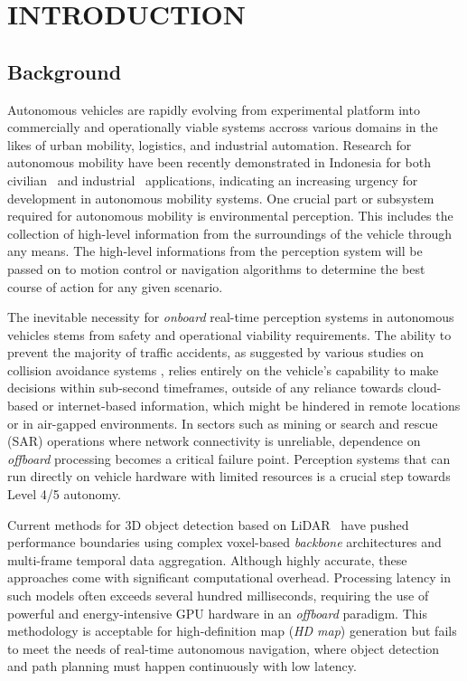 \chapter{INTRODUCTION}

\section{Background}

\sloppy

Autonomous vehicles are rapidly evolving from experimental platform into commercially and operationally viable systems accross various domains in the likes of urban mobility, logistics, and industrial automation. Research for autonomous mobility have been recently demonstrated in Indonesia for both civilian~\parencite{icar_drl} and industrial~\parencite{brin2024autonomous} applications, indicating an increasing urgency for development in autonomous mobility systems. One crucial part or subsystem required for autonomous mobility is environmental perception. This includes the collection of high-level information from the surroundings of the vehicle through any means. The high-level informations from the perception system will be passed on to motion control or navigation algorithms to determine the best course of action for any given scenario.

The inevitable necessity for \emph{onboard} real-time perception systems in autonomous vehicles stems from safety and operational viability requirements. The ability to prevent the majority of traffic accidents, as suggested by various studies on collision avoidance systems \parencite{external_dp_av}, relies entirely on the vehicle's capability to make decisions within sub-second timeframes, outside of any reliance towards cloud-based or internet-based information, which might be hindered in remote locations or in air-gapped environments. In sectors such as mining or search and rescue (SAR) operations where network connectivity is unreliable, dependence on \emph{offboard} processing becomes a critical failure point. Perception systems that can run directly on vehicle hardware with limited resources is a crucial step towards Level 4/5 autonomy.

Current methods for 3D object detection based on LiDAR~\parencite{ma2023detzero} have pushed performance boundaries using complex voxel-based \emph{backbone} architectures and multi-frame temporal data aggregation. Although highly accurate, these approaches come with significant computational overhead. Processing latency in such models often exceeds several hundred milliseconds, requiring the use of powerful and energy-intensive GPU hardware in an \emph{offboard} paradigm. This methodology is acceptable for high-definition map (\emph{HD map}) generation but fails to meet the needs of real-time autonomous navigation, where object detection and path planning must happen continuously with low latency.

